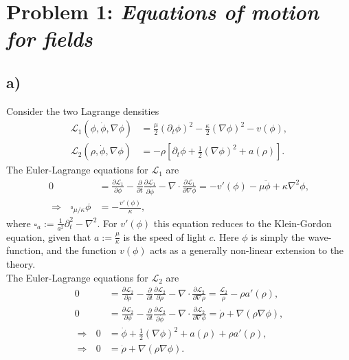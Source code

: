 \documentclass[english, parskip=full]{scrartcl}
\title{\titel}
\author{\autor}
\date{\today}
\newcommand{\kla}{}
\newcommand{\klam}{}
\begin{document}
\maketitle  %

\section*{Problem 1: \normalfont\textit{\large{Equations of motion for fields}}}
\subsection*{a)}
Consider the two Lagrange densities
\begin{align}
\mathcal{L}_1(\phi, \dot{\phi}, \nabla\phi) &= \frac{\mu }{2} (\partial_t\phi)^2 - \frac{\kappa}{2}\kla\left( {\nabla\phi} \right)^2 - v(\phi),\\
\mathcal{L}_2(\rho, \dot{\phi}, \nabla\phi) &= -\rho \klam\left[ {\partial_t\phi + \frac{1}{2}(\nabla\phi)^2 + a(\rho) } \right].
\end{align}
The Euler-Lagrange equations for $\mathcal{L}_1$ are
\begin{align}
0 &= \frac{\partial\mathcal{L}_1}{\partial\phi} - \frac{\partial}{\partial t} \frac{\partial \mathcal{L}_1}{\partial \dot{\phi}} - \nabla\cdot \frac{\partial \mathcal{L}_1}{\partial \nabla\phi} = -v'(\phi) - \mu\ddot{\phi} + \kappa\nabla^2\phi,\\
\Rightarrow \ \ \ \square_{\mu/\kappa}\phi &= -\frac{v'(\phi)}{\kappa},
\end{align}
where $\square_a := \frac{1}{a^2}\partial_t^2 - \nabla^2$. 
For $v'(\phi)$ this equation reduces to the Klein-Gordon equation, given that $a := \frac{\mu }{\kappa}$ is the speed of light $c$.
Here $\phi$ is simply the wave-function, and the function $v(\phi)$ acts as a generally non-linear extension to the theory.
\\
The Euler-Lagrange equations for $\mathcal{L}_2$ are
\begin{align}
0 &= \frac{\partial\mathcal{L}_2}{\partial\rho} - \frac{\partial}{\partial t} \frac{\partial \mathcal{L}_2}{\partial \dot{\rho}} - \nabla\cdot \frac{\partial \mathcal{L}_2}{\partial \nabla\rho} = \frac{\mathcal{L}_2}{\rho} - \rho a'(\rho),\\
0 &= \frac{\partial\mathcal{L}_2}{\partial\phi} - \frac{\partial}{\partial t} \frac{\partial \mathcal{L}_2}{\partial \dot{\phi}} - \nabla\cdot \frac{\partial \mathcal{L}_2}{\partial \nabla\phi} = \dot{\rho} + \nabla (\rho\nabla\phi),\\
\Rightarrow \ \ \ 0&= \dot{\phi} + \frac{1}{2}(\nabla\phi)^2 + a(\rho) + \rho a'(\rho),\\
\Rightarrow \ \ \ 0&= \dot{\rho} + \nabla (\rho\nabla\phi).
\end{align}
\end{document}
